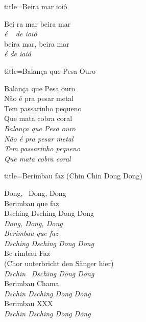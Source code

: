 \documentclass[fontsize=14pt, twoside]{scrreprt}
\begin{document}
\begin{multicols*}{2}
\begin{song}{title={Beira mar ioiô}}
\begin{verse*}
        Bei ra mar beira mar\\
        \textit{é} \ \textit{ de ioiô}\\
        beira mar, beira mar\\
        \textit{é de iaiá}\\
    \end{verse*}
\end{song}

\begin{song}{title={Balança que Pesa Ouro}}
        \begin{verse*}
        Balança que Pesa ouro \\ 
        Não é pra pesar metal \\ 
        Tem passarinho pequeno \\ 
        Que mata cobra coral \\
                
        \textit{Balança que Pesa ouro \\ 
        Não é pra pesar metal \\ 
        Tem passarinho pequeno \\ 
        Que mata cobra coral} \\
        \end{verse*}
\end{song}

\columnbreak
\begin{song}{title={Berimbau faz (Chin Chin Dong Dong)}}
        \begin{verse*}
            Dong, \ Dong, Dong\\
            Berimbau que faz\\
            Dsching Dsching Dong Dong\\
            \textit{Dong, Dong, Dong\\
            Berimbau que faz\\
            Dsching Dsching Dong Dong}\\
            Be rimbau Faz \\
            (Chor unterbricht den Sänger hier)\\
            \textit{Dschin} \ \textit{Dsching Dong Dong}\\
            Berimbau Chama\\
            \textit{Dschin Dsching Dong Dong}\\
            Berimbau XXX\\
            \textit{Dschin Dsching Dong Dong}\\
        \end{verse*}
\end{song}


\end{multicols*}
\end{document}
